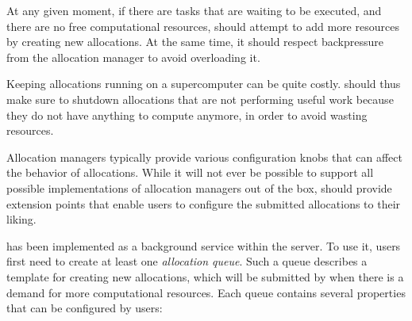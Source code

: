 \begin{description}[wide=0pt]
	\item[Allow computational resources to scale up] At any given moment, if there are tasks that are waiting to be executed, and there are no free
		computational resources, \autoalloc{} should attempt to add more resources by creating
		new allocations. At the same time, it should respect backpressure from the allocation manager to
		avoid overloading it.
	\item[Allow computational resources to scale down] Keeping allocations running on a supercomputer can be quite costly. \Autoalloc{} should
		thus make sure to shutdown allocations that are not performing useful work because they do not have
		anything to compute anymore, in order to avoid wasting resources.
	\item[Be flexible] Allocation managers typically provide various configuration knobs that can affect the behavior of
		allocations. While it will not ever be possible to support all possible implementations of
		allocation managers out of the box, \autoalloc{} should provide extension points that
		enable users to configure the submitted allocations to their liking.
\end{description}

\Autoalloc{} has been implemented as a background service within the
\hyperqueue{} server. To use it, users first need to create at least one
\emph{allocation queue}. Such a queue describes a template for creating new allocations, which will
be submitted by \hq{} when there is a demand for more computational resources.
Each queue contains several properties that can be configured by users:

